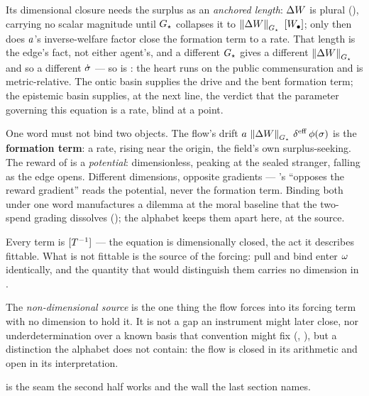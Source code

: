 \documentclass[../main]{subfiles}
\begin{document}
Its dimensional closure needs the surplus as an \emph{anchored length}: $\Delta W$ is
plural (), carrying no scalar magnitude until $G\sb{\star}$ collapses it to
$\left\lVert \Delta W \right\rVert\sb{ \ensuremath{G\sb{\star}} }\ [W\sb{\bullet}]$; only then does $a$'s inverse-welfare factor close
the formation term to a rate. That length is the edge's fact, not either agent's, and a
different $G\sb{\star}$ gives a different $\left\lVert \Delta W \right\rVert\sb{ \ensuremath{G\sb{\star}} }$ and so a different
$\dot{\sigma}$ --- so  is : the heart runs on the public
commensuration and is metric-relative. The ontic basin supplies the drive and the bent
formation term; the epistemic basin supplies, at the next line, the verdict that the parameter
governing this equation is a rate, blind at a point.

One word must not bind two objects. The flow's drift $\hingeA\,\normG{\surplus}\,
\effdensity\,\bendfn(\leanbare)$ is the \textbf{formation term}: a rate, rising near
the origin, the field's own surplus-seeking. The reward of  is a
\emph{potential}: dimensionless, peaking at the sealed stranger, falling as the edge
opens. Different dimensions, opposite gradients --- 's ``opposes the
reward gradient'' reads the potential, never the formation term. Binding both under
one word manufactures a dilemma at the moral baseline that the two-spend grading
dissolves (); the alphabet keeps them apart here, at the
source.

Every term is $[T\sp{-1}]$ --- the equation is dimensionally closed, the act it describes
fittable. What is not fittable is the source of the forcing: pull and bind enter $\omega$
identically, and the quantity that would distinguish them carries no dimension in
.

\begin{definition}
  The \emph{non-dimensional source} is the one thing the flow forces into its forcing term
  with no dimension to hold it. It is not a gap an instrument might later close, nor
  underdetermination over a known basis that convention might fix (,
  ), but a distinction the alphabet does not contain: the flow is closed in
  its arithmetic and open in its interpretation.
\end{definition}

 is the seam the second half works and the wall the last section names.
\end{document}
